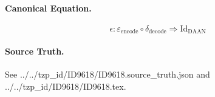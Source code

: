 \paragraph{Canonical Equation.}
\[
\epsilon: \varepsilon_{\text{encode}} \circ \delta_{\text{decode}} \Rightarrow \text{Id}_{\text{DAAN}}
\]

\paragraph{Source Truth.}
See ../../tzp\_id/ID9618/ID9618.source\_truth.json and ../../tzp\_id/ID9618/ID9618.tex.
